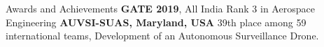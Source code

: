\begin{rubric}{Awards and Achievements}
\entry*[2019] \textbf{GATE 2019}, All India Rank 3 in Aerospace Engineering
%
\entry*[2017] \textbf{AUVSI-SUAS, Maryland, USA} 39th place among 59 international teams, Development of an Autonomous Surveillance Drone.


\end{rubric}